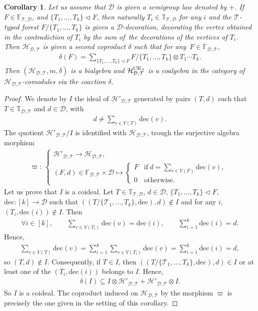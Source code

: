 \documentclass[pdftex]{sigma}
\numberwithin{equation}{section}
\newtheorem{Corollary}[Theorem]{Corollary}
\newcommand{\T}{\mathcal{T}}
\newcommand{\D}{\mathcal{D}}
\newcommand{\h}{\mathcal{H}}
\newcommand{\bfT}{\mathbb{T}}
\newcommand{\bfF}{\mathbb{F}}
\newcommand{\dec}{\mathrm{dec}}
\begin{document}
\begin{Corollary}
Let us assume that $\D$ is given a semigroup law denoted by $+$.
If $F\in \bfF_{\T,\D}$, and $\{T_1,\dots,T_k\}\triangleleft F$, then naturally
$T_i \in \bfT_{\T,\D}$ for any $i$ and the $\T$-typed forest $F/\{T_1,\dots,T_k\}$
is given a $\D$-decoration, decorating the vertex obtained in the contradiction of $T_i$
by the sum of~the decorations of the vertices of $T_i$. Then $\h_{\D,\T}$ is given a second coproduct $\delta$
such that for any~$F\in \bfF_{\D,\T}$,
\begin{gather*}
\delta(F)=\sum_{\{T_1,\dots,T_k\}\triangleleft F} F/\{T_1,\dots,T_k\}\otimes T_1\cdots T_k.
\end{gather*}
Then $(\h_{\D,\T},m,\delta)$ is a bialgebra and $\h_{\D,\T}^{{\rm CK}_\lambda}$ is a coalgebra
in the category of $\h_{\D,\T}$-comodules via the coaction $\delta$.
\end{Corollary}

\begin{proof}
We denote by $I$ the ideal of $\h'_{\D,\T}$ generated by pairs $(T,d)$ such that $T\in \bfT_{\D,\T}$
and $d\in \D$, with
\begin{gather*}
d\neq \sum_{v\in V(T)}\dec(v)
.\end{gather*}
The quotient $\h'_{\D,\T}/I$ is identified with $\h_{\D,\T}$, trough the surjective algebra morphism
\begin{gather*}\varpi\colon\ \begin{cases}
\h'_{\D,\T} \longrightarrow \h_{\D,\T},\\[1ex]
(F,d)\in \bfF_{\D,\T}\times \D \longmapsto \begin{cases}
\displaystyle F&\mbox{if}\ d=\sum_{v\in V(F)}\dec(v),\\
0&\mbox{otherwise}.
\end{cases}
\end{cases}
\end{gather*}
Let us prove that $I$ is a coideal. Let $T\in \bfT_{\T,\D}$, $d\in \D$,
$\{T_1,\dots,T_k\}\triangleleft F$, $\dec\colon [k]\longrightarrow \D$ such that
$((T/\{\T_1,\dots,T_k\},\dec),d)\notin I$ and for any $i$, $(T_i,\dec(i))\notin I$. Then
\begin{gather*}
\forall i\in [k],\qquad\sum_{v\in V(T_i)} \dec(v)=\dec(i),\qquad
\sum_{i=1}^k \dec(i)=d.
\end{gather*}
Hence,
\begin{gather*}
\sum_{v\in V(T)}\dec(v)=\sum_{i=1}^k \sum_{v\in V(T_i)} \dec(v)
=\sum_{i=1}^k \dec(i)=d,
\end{gather*}
so $(T,d)\notin I$. Consequently, if $T\in I$, then
$((T/\{\T_1,\dots,T_k\},\dec),d)\in I$ or at least one of the $(T_i,\dec(i))$ belongs to $I$.
Hence,
\begin{gather*}
\delta(I)\subseteq I\otimes \h'_{\D,\T}+\h'_{\D,\T}\otimes I.
\end{gather*}
So $I$ is a coideal. The coproduct induced on $\h_{\D,\T}$ by the morphism $\varpi$
is precisely the one given in the setting of this corollary.
\end{proof}\pagebreak
\end{document}
